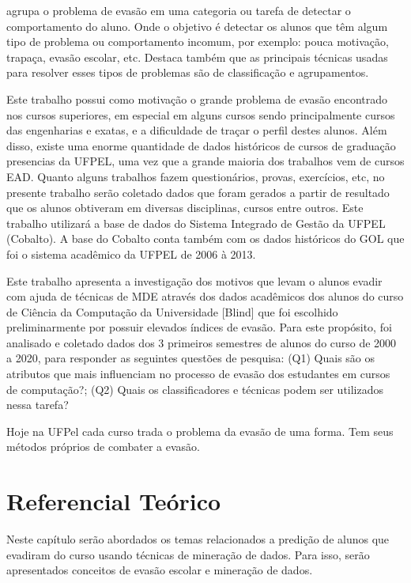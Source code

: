 \documentclass[diss,capa]{texufpel}
\begin{document}
\citet{baker2010data} agrupa o problema de evasão em uma categoria ou tarefa de detectar o comportamento do aluno.
Onde o objetivo é detectar os alunos que têm algum tipo de problema ou comportamento incomum, por exemplo: pouca motivação, trapaça, evasão escolar, etc.
Destaca também que as principais técnicas usadas para resolver esses tipos de problemas são de classificação e agrupamentos.

Este trabalho possui como motivação o grande problema de evasão encontrado nos cursos superiores, em especial em alguns cursos sendo principalmente cursos das engenharias e exatas, e a dificuldade de traçar o perfil destes alunos.
Além disso, existe uma enorme quantidade de dados históricos de cursos de graduação presencias da UFPEL, uma vez que a grande maioria dos trabalhos vem de cursos EAD.
Quanto alguns trabalhos fazem questionários, provas, exercícios, etc, no presente trabalho serão coletado dados que foram gerados a partir de resultado que os alunos obtiveram em diversas disciplinas, cursos entre outros.
Este trabalho utilizará a base de dados do Sistema Integrado de Gestão da UFPEL (Cobalto).
A base do Cobalto conta também com os dados históricos do GOL que foi o sistema acadêmico da UFPEL de 2006 à 2013.

Este trabalho apresenta a investigação dos motivos que levam o alunos evadir com ajuda de técnicas de MDE através dos dados acadêmicos dos alunos do curso de Ciência da Computação da Universidade [Blind] que foi escolhido preliminarmente por possuir elevados índices de evasão. Para este propósito, foi analisado e coletado dados dos 3 primeiros semestres de alunos do curso de 2000 a 2020, para responder as seguintes questões de pesquisa: (Q1) Quais são os atributos que mais influenciam no processo de evasão dos estudantes em cursos de computação?; (Q2) Quais os classificadores e técnicas podem ser utilizados nessa tarefa?

Hoje na UFPel cada curso trada o problema da evasão de uma forma.
Tem seus métodos próprios de combater a evasão.


\chapter{Referencial Teórico}
\label{cap:referencial-teorico}

Neste capítulo serão abordados os temas relacionados a predição de alunos que evadiram do curso usando técnicas de mineração de dados.
Para isso, serão apresentados conceitos de evasão escolar e mineração de dados.
\end{document}
